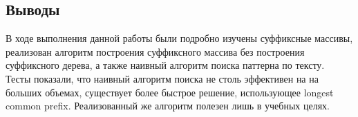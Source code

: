 \documentclass[12pt]{article}
\begin{document}
\subsection*{Выводы}

В ходе выполнения данной работы были подробно изучены суффиксные массивы, реализован алгоритм построения суффиксного массива без построения суффиксного дерева, а также наивный алгоритм поиска паттерна по тексту.\\
Тесты показали, что наивный алгоритм поиска не столь эффективен на на больших объемах, существует более быстрое решение, использующее longest common prefix. Реализованный же алгоритм полезен лишь в учебных целях.
\end{document}
